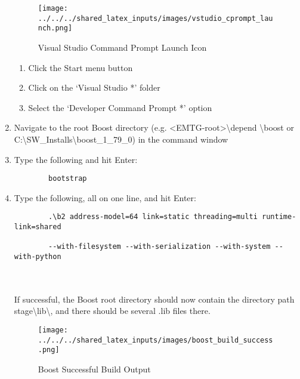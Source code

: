 \begin{enumerate}
		\begin{figure}[H]
			\centering
			\texttt{[image: ../../../shared\_latex\_inputs/images/vstudio\_cprompt\_launch.png]}
			\caption{Visual Studio Command Prompt Launch Icon}
		\end{figure}
	\begin{enumerate}
		\item Click the Start menu button
		\item Click on the `Visual Studio *' folder 
		\item Select the `Developer Command Prompt *' option
	\end{enumerate}
	\item Navigate to the root Boost directory (e.g. \textless EMTG-root\textgreater \textbackslash depend \textbackslash boost or \\ C:\textbackslash SW\_Installs\textbackslash boost\_1\_79\_0) in the command window
	\item Type the following and hit Enter:
	\begin{verbatim}
		bootstrap
	\end{verbatim}	
	\item Type the following, all on one line, and hit Enter:
	\begin{verbatim}
		.\b2 address-model=64 link=static threading=multi runtime-link=shared 
		
		--with-filesystem --with-serialization --with-system --with-python
	\end{verbatim} \\ \\
	If successful, the Boost root directory should now contain the directory path stage\textbackslash lib\textbackslash, and there should be several .lib files there. 
	\begin{figure}[H]
		\centering
		\texttt{[image: ../../../shared\_latex\_inputs/images/boost\_build\_success.png]}
		\caption{Boost Successful Build Output}
	\end{figure}
\end{enumerate}
